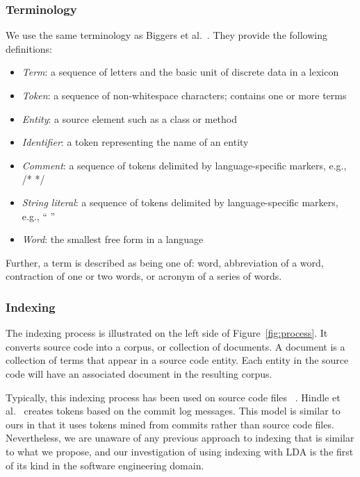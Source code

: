     \subsubsection{Terminology}
    We use the same terminology as Biggers et al.~\cite{Biggers_etal:2014}.
    They provide the following definitions:
    \begin{itemize}
    \setlength{\itemsep}{1pt}
    \setlength{\parskip}{0pt}
    \setlength{\parsep}{0pt}
    \item \textit{Term}: a sequence of letters and the basic unit of discrete data in a lexicon
    \item \textit{Token}: a sequence of non-whitespace characters; contains one or more terms
    \item \textit{Entity}: a source element such as a class or method
    \item \textit{Identifier}: a token representing the name of an entity
    \item \textit{Comment}: a sequence of tokens delimited by language-specific markers, e.g., /* */
    \item \textit{String literal}: a sequence of tokens delimited by language-specific markers, e.g., “ ”
    \item \textit{Word}: the smallest free form in a language
    \end{itemize}
    Further, a term is described as being one of:
    word, abbreviation of a word, contraction of one or two words,
    or acronym of a series of words.

    \subsubsection{Indexing}
    The indexing process is illustrated on the left side of Figure~\ref{fig:process}.
    It converts source code into a corpus, or collection of documents.
    A document is a collection of terms that appear in a source code entity.
    Each entity in the source code will have an associated document in the resulting corpus.

    Typically, this indexing process has been used on source code files ~\cite{Marcus-etal:2004}.
    Hindle et al.~\cite{Hindle-etal:2009} creates tokens based on the commit log messages.
    This model is similar to ours in that it uses tokens mined from commits rather than source code files.
    Nevertheless, we are unaware of any previous approach to indexing that is similar to what we propose,
    and our investigation of using indexing with LDA is the first of its kind in the software engineering domain.

